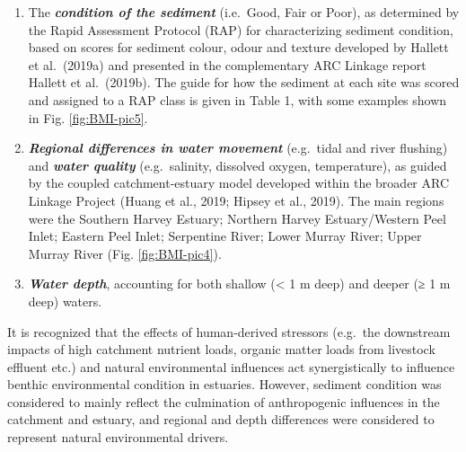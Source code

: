 \documentclass[
]{book}
\begin{document}
\begin{enumerate}
\def\labelenumi{\arabic{enumi}.}
\item
  The \textbf{\emph{condition of the sediment}} (i.e.~Good, Fair or Poor), as determined by the Rapid Assessment Protocol (RAP) for characterizing sediment condition, based on scores for sediment colour, odour and texture developed by Hallett et al.~(2019a) and presented in the complementary ARC Linkage report Hallett et al.~(2019b). The guide for how the sediment at each site was scored and assigned to a RAP class is given in Table 1, with some examples shown in Fig. \ref{fig:BMI-pic5}.
\item
  \textbf{\emph{Regional differences in water movement}} (e.g.~tidal and river flushing) and \textbf{\emph{water quality}} (e.g.~salinity, dissolved oxygen, temperature), as guided by the coupled catchment-estuary model developed within the broader ARC Linkage Project (Huang et al., 2019; Hipsey et al., 2019). The main regions were the Southern Harvey Estuary; Northern Harvey Estuary/Western Peel Inlet; Eastern Peel Inlet; Serpentine River; Lower Murray River; Upper Murray River (Fig. \ref{fig:BMI-pic4}).
\item
  \textbf{\emph{Water depth}}, accounting for both shallow (\textless{} 1 m deep) and deeper (≥ 1 m deep) waters.
\end{enumerate}

It is recognized that the effects of human-derived stressors (e.g.~the downstream impacts of high catchment nutrient loads, organic matter loads from livestock effluent etc.) and natural environmental influences act synergistically to influence benthic environmental condition in estuaries. However, sediment condition was considered to mainly reflect the culmination of anthropogenic influences in the catchment and estuary, and regional and depth differences were considered to represent natural environmental drivers.~
\end{document}

